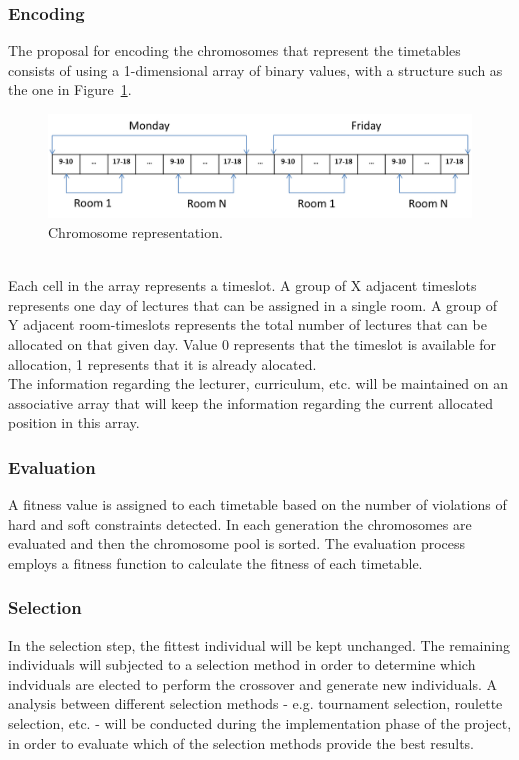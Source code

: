 \subsubsection{Encoding}
\label{subsubsubsec:ga-encoding}
The proposal for encoding the chromosomes that represent the timetables consists of using a 1-dimensional array of binary values, with a structure such as the one in Figure~\ref{fig:chromosomeRepresentation}.\\ 
\begin{figure}[h!]
 \centering
   \includegraphics[width=12cm]{./images/figures/Fig3_ChromosomeRepresentation_GA.png}
   \caption{Chromosome representation.}
   \label{fig:chromosomeRepresentation}
\end{figure}\\
Each cell in the array represents a timeslot. A group of X adjacent timeslots represents one day of lectures that can be assigned in a single room. A group of Y adjacent room-timeslots represents the total number of lectures that can be allocated on that given day. Value 0 represents that the timeslot is available for allocation, 1 represents that it is already alocated.\\
The information regarding the lecturer, curriculum, etc. will be maintained on an associative array that will keep the information regarding the current allocated position in this array.\\
\subsubsection{Evaluation}
\label{subsubsubsec:ga-evaluation}
A fitness value is assigned to each timetable based on the number of violations of hard and soft constraints detected. In each generation the chromosomes are evaluated and then the chromosome pool is sorted. The evaluation process employs a fitness function to calculate the fitness of each timetable.\\
\subsubsection{Selection}
\label{subsubsubsec:ga-selection}
In the selection step, the fittest individual will be kept unchanged. The remaining individuals will subjected to a selection method in order to determine which indviduals are elected to perform the crossover and generate new individuals. A analysis between different selection methods - e.g. tournament selection, roulette selection, etc. - will be conducted during the implementation phase of the project, in order to evaluate which of the selection methods provide the best results.\\
